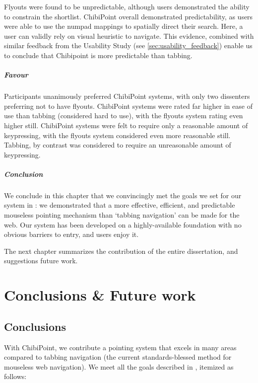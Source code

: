 \documentclass[11pt,openright,a4paper]{report}
\begin{document}
Flyouts were found to be unpredictable, although users demonstrated the ability to constrain the shortlist. ChibiPoint overall demonstrated predictability, as users were able to use the numpad mappings to spatially direct their search. Here, a user can validly rely on visual heuristic to navigate. This evidence, combined with similar feedback from the Usability Study (see \cref{sec:usability_feedback}) enable us to conclude that Chibipoint is more predictable than tabbing.

\paragraph{Favour}
Participants unanimously preferred ChibiPoint systems, with only two dissenters preferring not to have flyouts. ChibiPoint systems were rated far higher in ease of use than tabbing (considered hard to use), with the flyouts system rating even higher still. ChibiPoint systems were felt to require only a reasonable amount of keypressing, with the flyouts system considered even more reasonable still. Tabbing, by contrast was considered to require an unreasonable amount of keypressing.

\paragraph{Conclusion}
We conclude in this chapter that we convincingly met the goals we set for our system in : we demonstrated that a more effective, efficient, and predictable mouseless pointing mechanism than `tabbing navigation' can be made for the web. Our system has been developed on a highly-available foundation with no obvious barriers to entry, and users enjoy it.

The next chapter summarizes the contribution of the entire dissertation, and suggestions future work.

\chapter{Conclusions \& Future work}
\label{chap:conclusions}
\section{Conclusions}
With ChibiPoint, we contribute a pointing system that excels in many areas compared to tabbing navigation (the current standards-blessed method for mouseless web navigation). We meet all the goals described in , itemized as follows:
\end{document}
